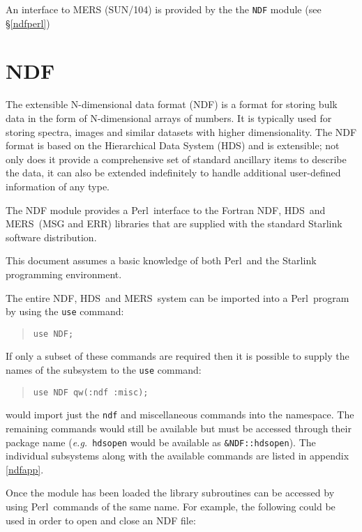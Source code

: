 \documentclass[twoside,11pt]{article}
\newenvironment{myquote}{\begin{quote}\begin{small}}{\end{small}\end{quote}}
\newcommand{\ndf}{\xref{NDF}{sun33}{}}
\newcommand{\perl}{\xref{\textsf{Perl}}{sun193}{}}
\newcommand{\hds}{\xref{HDS}{sun92}{}}
\newcommand{\mers}{\xref{MERS}{sun104}{}}
\newcommand{\xref}[3]{#1}
\renewcommand{\_}{\texttt{\symbol{95}}}
\begin{document}
An interface to MERS (\xref{SUN/104}{sun104}{}) is provided by the 
the \texttt{NDF} module (see \S\ref{ndfperl})

\section{NDF\label{ndfperl}}

The extensible N-dimensional data format (NDF) is a format for storing bulk
data in the form of N-dimensional arrays of numbers.  It is typically used
for storing spectra, images and similar datasets with higher dimensionality.
The NDF format is based on the Hierarchical Data System (HDS) and is
extensible; not only does it provide a comprehensive set of standard
ancillary items to describe the data, it can also be extended indefinitely
to handle additional user-defined information of any type.

The NDF module provides a \perl\ interface to the Fortran \ndf, \hds\ and
\mers\ (MSG and ERR) libraries that are supplied with the standard Starlink
software distribution.

This document assumes a basic knowledge of both \perl\ and the Starlink
programming environment.

The entire \ndf, \hds\ and \mers\ system can be imported into a \perl\ program
by using the \texttt{use} command:

\begin{myquote}
\begin{verbatim}
use NDF;
\end{verbatim}
\end{myquote}

If only a subset of these commands are required then it is possible to supply
the names of the subsystem to the \texttt{use} command:

\begin{myquote}
\begin{verbatim}
use NDF qw(:ndf :misc);
\end{verbatim}
\end{myquote}

would import just the \texttt{ndf\_} and miscellaneous commands into
the namespace. The remaining commands would still be available but must
be accessed through their package name (\emph{e.g.}\ \texttt{hds\_open}
would be available as \texttt{\&NDF::hds\_open}). The individual
subsystems along with the available commands are listed in appendix
\ref{ndfapp}.

Once the module has been loaded the library subroutines can be accessed
by using \perl\ commands of the same name. For example, the following
could be used in order to open and close an NDF file:
\end{document}
